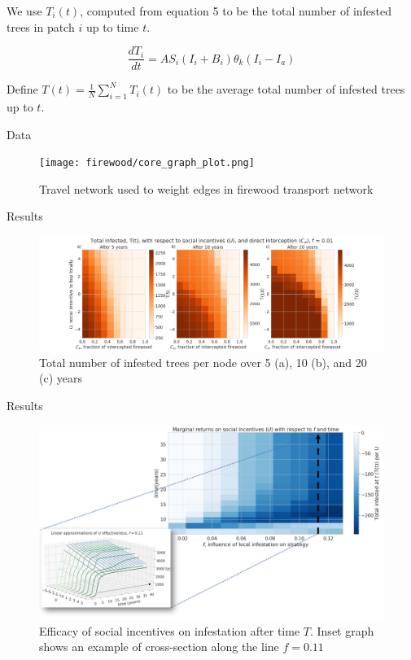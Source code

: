 \documentclass{beamer}
\begin{document}
\begin{frame}{}    

    We use $T_i(t)$, computed from equation 5 to be the total number of infested trees in patch $i$ up to time $t$. 

    \begin{equation}
        \frac{dT_i}{dt}= A S_i (I_i+ B_i)\theta_k(I_i - I_a)
        \label{sum_eqn}
    \end{equation}

    Define $T(t) = \frac{1}{N} \sum_{i=1}^N T_i(t)$ to be the average total number of infested trees up to $t$.
\end{frame}


\begin{frame}{Data}

    \begin{figure}
        \texttt{[image: firewood/core\_graph\_plot.png]}
        \caption{Travel network used to weight edges in firewood transport network}
    \end{figure}
\end{frame}


\begin{frame}{Results}
    \begin{figure}
        \includegraphics[width=\textwidth]{firewood/ct_v_ce_plane.png}
        \caption{Total number of infested trees per node over 5 (a), 10 (b), and 20 (c) years}
    \end{figure}
\end{frame}

\begin{frame}{Results}
    \begin{figure}
        \includegraphics[width=\textwidth]{firewood/p1.jpg}
        \caption{Efficacy of social incentives on infestation after time $T$. Inset graph shows an example of cross-section along the line $f = 0.11$}
    \end{figure}
\end{frame}
\end{document}
